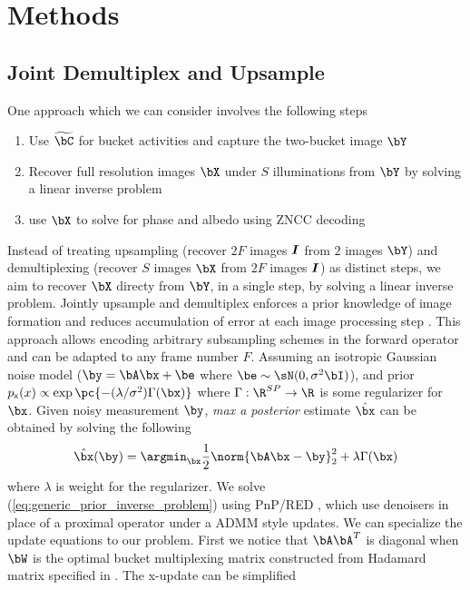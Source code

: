 \documentclass[../writeup.tex]{subfiles}
\begin{document}
  


\section{Methods}


\subsection{Joint Demultiplex and Upsample}

One approach which we can consider involves the following steps
\begin{enumerate}
    \item Use $\widetilde{\bC}$ for bucket activities and capture the two-bucket image $\bY$
    \item Recover full resolution images $\bX$ under $S$ illuminations from $\bY$ by solving a linear inverse problem
    \item use $\bX$ to solve for phase and albedo using ZNCC decoding \cite{mirdehghanOptimalStructuredLight2018}
\end{enumerate}
Instead of treating upsampling (recover $2F$ images $\boldsymbol{I}$ from $2$ images $\bY$) and demultiplexing (recover $S$ images $\bX$ from $2F$ images $\boldsymbol{I}$) as distinct steps, we aim to recover $\bX$ directy from $\bY$, in a single step, by solving a linear inverse problem. Jointly upsample and demultiplex enforces a prior knowledge of image formation and reduces accumulation of error at each image processing step \cite{heideFlexISPFlexibleCamera2014}. This approach allows encoding arbitrary subsampling schemes in the forward operator and can be adapted to any frame number $F$. Assuming an isotropic Gaussian noise model ($\by=\bA\bx + \be$ where $\be\sim \sN(0,\sigma^2 \bI)$), and prior $p_{\rx}(x) \propto \exp\pc{- (\lambda/\sigma^2) \Gamma(\bx) }$ where $\Gamma:\R^{SP}\to\R$ is some regularizer for $\bx$. Given noisy measurement $\by$, \textit{max a posterior} estimate $\hat{\bx}$ can be obtained by solving the following
\begin{align}
    \hat{\bx}(\by)
        = \argmin_{\bx}
        \frac{1}{2} \norm{\bA\bx-\by}_2^2 + \lambda \Gamma(\bx)
    \label{eq:generic_prior_inverse_problem}
\end{align}
where $\lambda$ is weight for the regularizer. We solve (\ref{eq:generic_prior_inverse_problem}) using PnP/RED \cite{venkatakrishnanPlugandPlayPriorsModel2013,romanoLittleEngineThat2016}, which use denoisers in place of a proximal operator under a ADMM style updates. We can specialize the update equations to our problem. First we notice that $\bA\bA^T$ is diagonal when $\bW$ is the optimal bucket multiplexing matrix constructed from Hadamard matrix specified in \cite{weiCodedTwoBucketCameras2018}. The x-update can be simplified  \cite{liuRankMinimizationSnapshot2019} 
\end{document}
